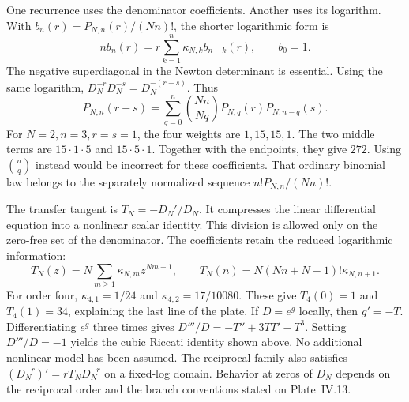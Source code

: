 One recurrence uses the denominator coefficients. Another uses its logarithm. With $b_n(r)=P_{N,n}(r)/(Nn)!$, the shorter logarithmic form is
\[
nb_n(r)=r\sum_{k=1}^{n}\kappa_{N,k}b_{n-k}(r),\qquad b_0=1.
\]
The negative superdiagonal in the Newton determinant is essential.
Using the same logarithm, $D_N^{-r}D_N^{-s}=D_N^{-(r+s)}$. Thus
\[
P_{N,n}(r+s)=\sum_{q=0}^{n}\binom{Nn}{Nq}P_{N,q}(r)P_{N,n-q}(s).
\]
For $N=2,n=3,r=s=1$, the four weights are $1,15,15,1$. The two middle terms are $15\cdot1\cdot5$ and $15\cdot5\cdot1$. Together with the endpoints, they give $272$.
Using $\binom nq$ instead would be incorrect for these coefficients. That ordinary binomial law belongs to the separately normalized sequence $n!P_{N,n}/(Nn)!$.

The transfer tangent is $T_N=-D_N'/D_N$. It compresses the linear differential equation into a nonlinear scalar identity. This division is allowed only on the zero-free set of the denominator.
The coefficients retain the reduced logarithmic information:
\[
T_N(z)=N\sum_{m\ge1}\kappa_{N,m}z^{Nm-1},
\qquad T_N(n)=N(Nn+N-1)!\kappa_{N,n+1}.
\]
For order four, $\kappa_{4,1}=1/24$ and $\kappa_{4,2}=17/10080$. These give $T_4(0)=1$ and $T_4(1)=34$, explaining the last line of the plate.
If $D=e^g$ locally, then $g'=-T$. Differentiating $e^g$ three times gives $D'''/D=-T''+3TT'-T^3$. Setting $D'''/D=-1$ yields the cubic Riccati identity shown above. No additional nonlinear model has been assumed.
The reciprocal family also satisfies $(D_N^{-r})'=rT_ND_N^{-r}$ on a fixed-log domain. Behavior at zeros of $D_N$ depends on the reciprocal order and the branch conventions stated on Plate~IV.13.

